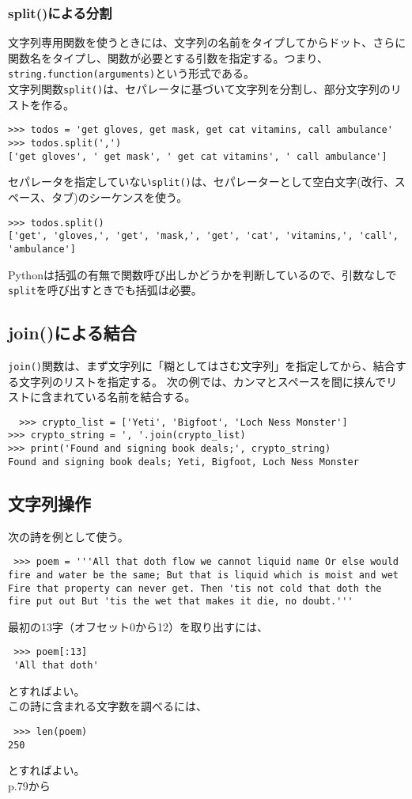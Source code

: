 \documentclass[11pt, oneside]{article}   	%
\begin{document}
 \subsubsection{split()による分割}
 文字列専用関数を使うときには、文字列の名前をタイプしてからドット、さらに関数名をタイプし、関数が必要とする引数を指定する。つまり、\verb|string.function(arguments)|という形式である。\\
 文字列関数\verb|split()|は、セパレータに基づいて文字列を分割し、部分文字列のリストを作る。
 \begin{lstlisting}
>>> todos = 'get gloves, get mask, get cat vitamins, call ambulance'
>>> todos.split(',')
['get gloves', ' get mask', ' get cat vitamins', ' call ambulance']
 \end{lstlisting}
 セパレータを指定していない\verb|split()|は、セパレーターとして空白文字(改行、スペース、タブ)のシーケンスを使う。
 \begin{lstlisting}
>>> todos.split()
['get', 'gloves,', 'get', 'mask,', 'get', 'cat', 'vitamins,', 'call', 'ambulance']
\end{lstlisting}
 Pythonは括弧の有無で関数呼び出しかどうかを判断しているので、引数なしで\verb|split|を呼び出すときでも括弧は必要。
 
 \subsection{join()による結合}
 \verb|join()|関数は、まず文字列に「糊としてはさむ文字列」を指定してから、結合する文字列のリストを指定する。
 次の例では、カンマとスペースを間に挟んでリストに含まれている名前を結合する。
  \begin{lstlisting}
  >>> crypto_list = ['Yeti', 'Bigfoot', 'Loch Ness Monster']
>>> crypto_string = ', '.join(crypto_list)
>>> print('Found and signing book deals;', crypto_string)
Found and signing book deals; Yeti, Bigfoot, Loch Ness Monster
  \end{lstlisting}
  
  \subsection{文字列操作}
  次の詩を例として使う。
   \begin{lstlisting}
 >>> poem = '''All that doth flow we cannot liquid name Or else would fire and water be the same; But that is liquid which is moist and wet Fire that property can never get. Then 'tis not cold that doth the fire put out But 'tis the wet that makes it die, no doubt.'''
   \end{lstlisting}
  最初の13字（オフセット0から12）を取り出すには、
 \begin{lstlisting}
 >>> poem[:13]
 'All that doth'
 \end{lstlisting}
 とすればよい。\\
 この詩に含まれる文字数を調べるには、
 \begin{lstlisting}
 >>> len(poem)
250
 \end{lstlisting}
 とすればよい。\\
 
 p.79から
 
\end{document}
